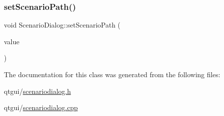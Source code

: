 \subsubsection{\texorpdfstring{setScenarioPath()}{setScenarioPath()}}
{\footnotesize\ttfamily void Scenario\+Dialog\+::set\+Scenario\+Path (\begin{DoxyParamCaption}\item[{const Q\+String \&}]{value }\end{DoxyParamCaption})}



The documentation for this class was generated from the following files\+:\begin{DoxyCompactItemize}
\item 
qtgui/\mbox{\hyperlink{scenariodialog_8h}{scenariodialog.\+h}}\item 
qtgui/\mbox{\hyperlink{scenariodialog_8cpp}{scenariodialog.\+cpp}}\end{DoxyCompactItemize}
